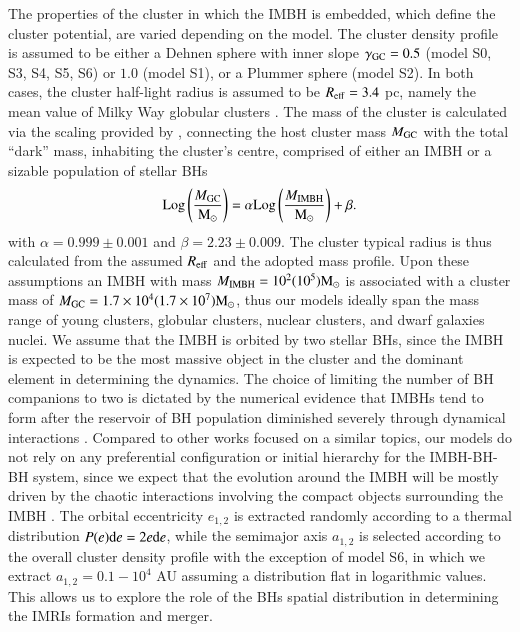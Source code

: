 \documentclass[article]{aa}
\newcommand{\Log}{{\rm Log}}
\newcommand{\Ms}{{\rm M}_\odot}
\newcommand{\gc}{{\rm GC}}
\newcommand{\ibh}{{\rm IMBH}}
\begin{document}
{The properties of the cluster in which the IMBH is embedded, which define the cluster potential, are varied depending on the model. The cluster density profile is assumed to be either a Dehnen sphere with inner slope $\gamma_\gc = 0.5$ (model S0, S3, S4, S5, S6) or $1.0$ (model S1), or a Plummer sphere (model S2). In both cases, the cluster half-light radius is assumed to be $R_{\rm eff} = 3.4$ pc, namely the mean value of Milky Way globular clusters \citep{harris14}. The mass of the cluster is calculated via the scaling provided by \cite{AS16}, connecting the host cluster mass $M_\gc$ with the total ``dark'' mass, inhabiting the cluster's centre, comprised of either an IMBH or a sizable population of stellar BHs
\begin{equation}
\Log \left(\frac{M_\gc}{\Ms}\right) = \alpha \Log \left(\frac{M_\ibh}{\Ms}\right) + \beta.
\label{mcmibh}
\end{equation}
with $\alpha = 0.999 \pm 0.001$ and $\beta = 2.23 \pm 0.009$. The cluster typical radius is thus calculated from the assumed $R_{\rm eff}$ and the adopted mass profile. Upon these assumptions an IMBH with mass $M_\ibh = 10^2(10^5)\Ms$ is associated with a cluster mass of $ M_\gc = 1.7\times 10^4(1.7\times 10^7)\Ms$, thus our models ideally span the mass range of young clusters, globular clusters, nuclear clusters, and dwarf galaxies nuclei. We assume that the IMBH is orbited by two stellar BHs, since the IMBH is expected to be the most massive object in the cluster and the dominant element in determining the dynamics. 
The choice of limiting the number of BH companions to two is dictated by the numerical evidence that IMBHs tend to form after the reservoir of BH population diminished severely through dynamical interactions \citep{zwart02,giersz15}. Compared to other works focused on a similar topics, our models do not rely on any  preferential configuration or initial hierarchy for the IMBH-BH-BH system, since we expect that the evolution around the IMBH will be mostly driven by the chaotic interactions involving the compact objects surrounding the IMBH \citep[e.g.][]{konstantinidis13}. The orbital eccentricity $e_{1,2}$ is extracted randomly according to a thermal distribution $P(e){\rm d} e = 2e{\rm d}e$, while the semimajor axis $a_{1,2}$ is selected according to the overall cluster density profile with the exception of model S6, in which we extract $a_{1,2} = 0.1-10^4$ AU assuming a distribution flat in logarithmic values. This allows us to explore the role of the BHs spatial distribution in determining the IMRIs formation and merger.

}
\end{document}
